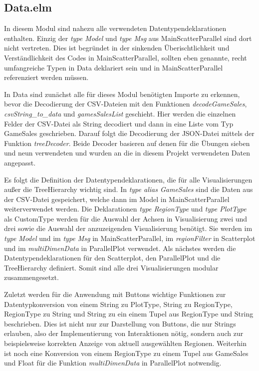 \documentclass[usegeometry=true]{scrartcl}
\begin{document}
\subsection{Data.elm}
In diesem Modul sind nahezu alle verwendeten Datentypendeklarationen enthalten. Einzig der \textit{type Model} und \textit{type Msg} aus MainScatterParallel sind dort nicht vertreten. 
Dies ist begründet in der sinkenden Überischtlichkeit und Verständlichkeit des Codes in MainScatterParallel, sollten eben genannte, recht umfangreiche Typen in Data deklariert sein und in MainScatterParallel referenziert werden müssen.

In Data sind zunächst alle für dieses Modul benötigten Importe zu erkennen, bevor die Decodierung der CSV-Dateien mit den Funktionen \textit{decodeGameSales}, \textit{csvString_to_data} und \textit{gamesSalesList} geschieht. 
Hier werden die einzelnen Felder der CSV-Datei als String decodiert und dann in eine Liste vom Typ GameSales geschrieben.
Darauf folgt die Decodierung der JSON-Datei mittels der Funktion \textit{treeDecoder}.
Beide Decoder basieren auf denen für die Übungen sieben und neun verwendeten und wurden an die in diesem Projekt verwendeten Daten angepasst.

Es folgt die Definition der Datentypendeklarationen, die für alle Visualisierungen außer die TreeHierarchy wichtig sind. 
In \textit{type alias GameSales} sind die Daten aus der CSV-Datei gespeichert, welche dann im Model in MainScatterParallel weiterverwendet werden. 
Die Deklarationen \textit{type RegionType} und \textit{type PlotType} als CustomType werden für die Auswahl der Achsen in Visualisierung zwei und drei sowie die Auswahl der anzuzeigenden Visualisierung benötigt.
Sie werden im \textit{type Model} und im \textit{type Msg} in MainScatterParallel, im \textit{regionFilter} in Scatterplot und im \textit{multiDimenData} in ParallelPlot verwendet. 
Als nächstes werden die Datentypendeklarationen für den Scatterplot, den ParallelPlot und die TreeHierarchy definiert. 
Somit sind alle drei Visualisierungen modular zusammengesetzt.

Zuletzt werden für die Anwendung mit Buttons wichtige Funktionen zur Datentypkonversion von einem String zu PlotType, String zu RegionType, RegionType zu String und String zu ein einem Tupel aus RegionType und String beschrieben. 
Dies ist nicht nur zur Darstellung von Buttons, die nur Strings erlauben, also der Implementierung von Interaktionen nötig, sondern auch zur beispielsweise korrekten Anzeige von aktuell ausgewählten Regionen.
Weiterhin ist noch eine Konversion von einem RegionType zu einem Tupel aus GameSales und Float für die Funktion \textit{multiDimenData} in ParallelPlot notwendig.
\end{document}
